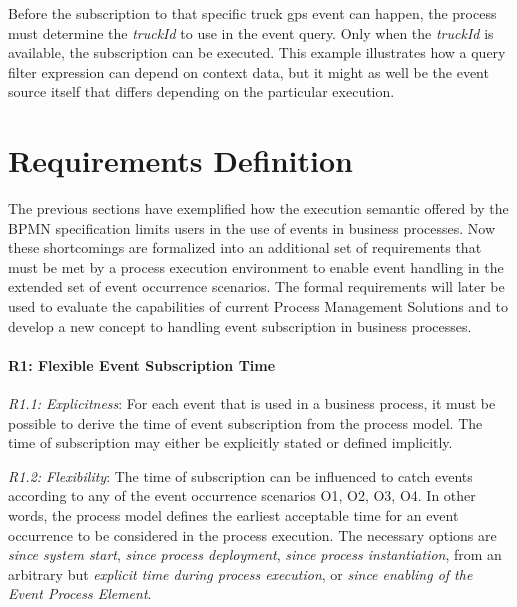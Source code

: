 
Before the subscription to that specific truck gps event can happen, the process must determine the \textit{truckId} to use in the event query. Only when the \textit{truckId} is available, the subscription can be executed. This example illustrates how a query filter expression can depend on context data, but it might as well be the event source itself that differs depending on the particular execution.




\section{Requirements Definition}
The previous sections have exemplified how the execution semantic offered by the BPMN specification limits users in the use of events in business processes. Now these shortcomings are formalized into an additional set of requirements that must be met by a process execution environment to enable event handling in the extended set of event occurrence scenarios.
The formal requirements will later be used to evaluate the capabilities of current Process Management Solutions and to develop a new concept to handling event subscription in business processes. 

\paragraph{R1: Flexible Event Subscription Time\newline}


\textit{R1.1: Explicitness}: 
For each event that is used in a business process, it must be possible to derive the time of event subscription from the process model. The time of subscription may either be explicitly stated or defined implicitly.

\textit{R1.2: Flexibility}: 
The time of subscription can be influenced to catch events according to any of the event occurrence scenarios O1, O2, O3, O4. In other words, the process model defines the earliest acceptable time for an event occurrence to be considered in the process execution. The necessary options are \textit{since system start}, \textit{since process deployment}, \textit{since process instantiation}, from an arbitrary but \textit{explicit time during process execution}, or \textit{since enabling of the Event Process Element}.

